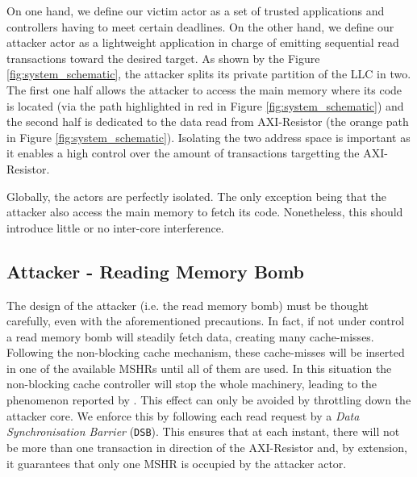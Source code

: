         On one hand, we define our victim actor as a set of trusted applications and controllers having to meet certain deadlines.
        On the other hand, we define our attacker actor as a lightweight application in charge of emitting sequential read transactions toward the desired target.
        As shown by the Figure \ref{fig:system_schematic}, the attacker splits its private partition of the LLC in two.
        The first one half allows the attacker to access the main memory where its code is located (via the path highlighted in red in Figure \ref{fig:system_schematic}) and the second half is dedicated to the data read from AXI-Resistor (the orange path in Figure \ref{fig:system_schematic}).
        Isolating the two address space is important as it enables a high control over the amount of transactions targetting the AXI-Resistor.

        Globally, the actors are perfectly isolated.
        The only exception being that the attacker also access the main memory to fetch its code.
        Nonetheless, this should introduce little or no inter-core interference.

    \subsection{Attacker - Reading Memory Bomb}
        \label{subsec:attacker_reading_memory_bomb}
        The design of the attacker (i.e. the read memory bomb) must be thought carefully, even with the aforementioned precautions.
        In fact, if not under control a read memory bomb will steadily fetch data, creating many cache-misses.
        Following the non-blocking cache mechanism, these cache-misses will be inserted in one of the available MSHRs until all of them are used.
        In this situation the non-blocking cache controller will stop the whole machinery, leading to the phenomenon reported by \cite{Heechul_DDOS_attacks_on_shared_cache}.
        This effect can only be avoided by throttling down the attacker core.
        We enforce this by following each read request by a \emph{Data Synchronisation Barrier} (\texttt{DSB}).
        This ensures that at each instant, there will not be more than one transaction in direction of the AXI-Resistor and, by extension, it guarantees that only one MSHR is occupied by the attacker actor.

